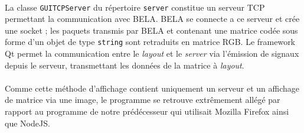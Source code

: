 \paragraph{}
La classe \verb!GUITCPServer! du répertoire \verb!server! constitue un
serveur TCP permettant la communication avec BELA. BELA se connecte a ce
serveur et crée une socket ; les paquets transmis par BELA et
contenant une matrice codée sous forme d'un objet de type
\verb!string! sont retraduits en matrice RGB. Le framework Qt permet
la communication entre le \textit{layout} et le \textit{server} via
l'émission de signaux depuis le serveur, transmettant les données de
la matrice à \textit{layout}.

\paragraph{}
Comme cette méthode d'affichage contient uniquement un serveur et un affichage
de matrice via une image, le programme se retrouve
extrêmement allégé par rapport au programme de notre prédécesseur qui utilisait Mozilla Firefox ainsi que NodeJS.
